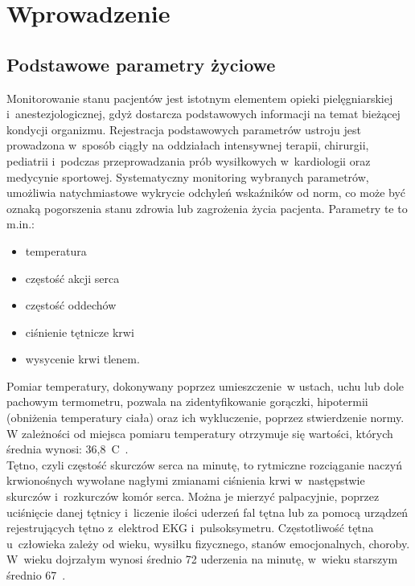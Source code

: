 \renewcommand{\figurename}{Rys.}

\chapter*{Wprowadzenie}
\label{cha:wprowadzenie}

\section*{Podstawowe parametry życiowe}
\label{sec:ParametryZyciowe}

\fontsize{14}{15}\selectfont

Monitorowanie stanu pacjentów jest istotnym elementem opieki pielęgniarskiej i~anestezjologicznej, gdyż dostarcza podstawowych 
informacji na temat bieżącej kondycji organizmu. Rejestracja podstawowych parametrów ustroju jest prowadzona w~sposób ciągły 
na oddziałach intensywnej terapii, chirurgii, pediatrii i~podczas przeprowadzania prób wysiłkowych w~kardiologii oraz medycynie 
sportowej. Systematyczny monitoring wybranych parametrów, umożliwia natychmiastowe wykrycie odchyleń wskaźników od norm, co 
może być oznaką pogorszenia stanu zdrowia lub zagrożenia życia pacjenta. Parametry te to m.in.:

\begin{itemize}
	\item temperatura
	\item częstość akcji serca
	\item częstość oddechów
	\item ciśnienie tętnicze krwi
	\item wysycenie krwi tlenem.
\end{itemize}

Pomiar temperatury, dokonywany poprzez umieszczenie~w ustach, uchu lub dole pachowym termometru, pozwala na zidentyfikowanie gorączki, 
hipotermii (obniżenia temperatury ciała) oraz ich wykluczenie, poprzez stwierdzenie normy. W zależności od miejsca pomiaru temperatury 
otrzymuje się wartości, których średnia wynosi: 36,8\textdegree~C~\cite{SzGa11}.\\

Tętno, czyli częstość skurczów serca na minutę, to rytmiczne rozciąganie naczyń krwionośnych wywołane nagłymi zmianami ciśnienia krwi 
w~następstwie skurczów i~rozkurczów komór serca. Można je mierzyć palpacyjnie, poprzez uciśnięcie danej tętnicy i~liczenie ilości uderzeń 
fal tętna lub za pomocą urządzeń rejestrujących tętno z~elektrod EKG i~pulsoksymetru.
Częstotliwość tętna u~człowieka zależy od wieku, wysiłku fizycznego, stanów emocjonalnych, choroby. W~wieku dojrzałym wynosi średnio 72 
uderzenia na minutę, w~wieku starszym średnio 67~\cite{SzGa11}.\\

